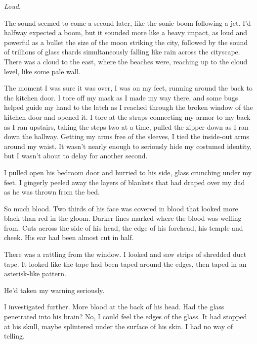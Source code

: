 \emph{Loud}.



The sound seemed to come a second later, like the sonic boom following a jet.  I'd halfway expected a boom, but it sounded more like a heavy impact, as loud and powerful as a bullet the size of the moon striking the city, followed by the sound of trillions of glass shards simultaneously falling like rain across the cityscape.  There was a cloud to the east, where the beaches were, reaching up to the cloud level, like some pale wall.



The moment I was sure it was over, I was on my feet, running around the back to the kitchen door.  I tore off my mask as I made my way there, and some bugs helped guide my hand to the latch as I reached through the broken window of the kitchen door and opened it.  I tore at the straps connecting my armor to my back as I ran upstairs, taking the steps two at a time, pulled the zipper down as I ran down the hallway.  Getting my arms free of the sleeves, I tied the inside-out arms around my waist.  It wasn't nearly enough to seriously hide my costumed identity, but I wasn't about to delay for another second.



I pulled open his bedroom door and hurried to his side, glass crunching under my feet.  I gingerly peeled away the layers of blankets that had draped over my dad as he was thrown from the bed.



So much blood.  Two thirds of his face was covered in blood that looked more black than red in the gloom.  Darker lines marked where the blood was welling from.  Cuts across the side of his head, the edge of his forehead, his temple and cheek.  His ear had been almost cut in half.



There was a rattling from the window.  I looked and saw strips of shredded duct tape.  It looked like the tape had been taped around the edges, then taped in an asterisk-like pattern.



He'd taken my warning seriously.



I investigated further.  More blood at the back of his head.  Had the glass penetrated into his brain?  No, I could feel the edges of the glass.  It had stopped at his skull, maybe splintered under the surface of his skin.  I had no way of telling.



